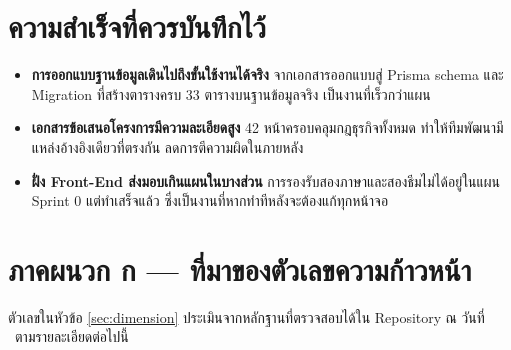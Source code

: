 \section{ความสำเร็จที่ควรบันทึกไว้}

\begin{itemize}
  \item \textbf{การออกแบบฐานข้อมูลเดินไปถึงขั้นใช้งานได้จริง} จากเอกสารออกแบบสู่ Prisma schema และ Migration ที่สร้างตารางครบ 33 ตารางบนฐานข้อมูลจริง เป็นงานที่เร็วกว่าแผน
  \item \textbf{เอกสารข้อเสนอโครงการมีความละเอียดสูง} 42 หน้าครอบคลุมกฎธุรกิจทั้งหมด ทำให้ทีมพัฒนามีแหล่งอ้างอิงเดียวที่ตรงกัน ลดการตีความผิดในภายหลัง
  \item \textbf{ฝั่ง Front-End ส่งมอบเกินแผนในบางส่วน} การรองรับสองภาษาและสองธีมไม่ได้อยู่ในแผน Sprint 0 แต่ทำเสร็จแล้ว ซึ่งเป็นงานที่หากทำทีหลังจะต้องแก้ทุกหน้าจอ
\end{itemize}

\clearpage
\section*{ภาคผนวก ก — ที่มาของตัวเลขความก้าวหน้า}

ตัวเลขในหัวข้อ \ref{sec:dimension} ประเมินจากหลักฐานที่ตรวจสอบได้ใน Repository ณ วันที่ \reportdate\ ตามรายละเอียดต่อไปนี้

